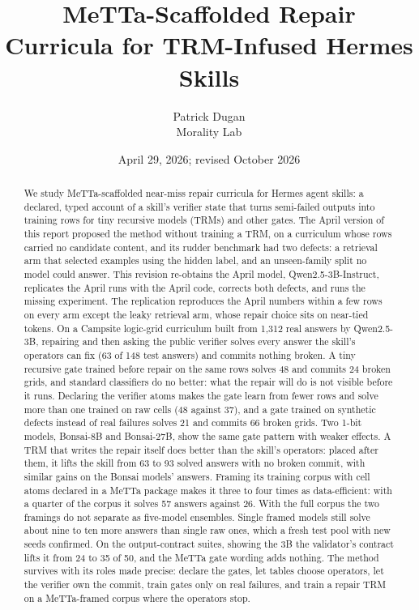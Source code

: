 \documentclass[11pt]{article}
\title{MeTTa-Scaffolded Repair Curricula for TRM-Infused Hermes Skills}
\author{Patrick Dugan\\Morality Lab}
\date{April 29, 2026; revised October 2026}
\begin{document}
\maketitle

\begin{abstract}
We study MeTTa-scaffolded near-miss repair curricula for Hermes agent skills: a declared, typed account of a skill's verifier state that turns semi-failed outputs into training rows for tiny recursive models (TRMs) and other gates. The April version of this report proposed the method without training a TRM, on a curriculum whose rows carried no candidate content, and its rudder benchmark had two defects: a retrieval arm that selected examples using the hidden label, and an unseen-family split no model could answer. This revision re-obtains the April model, Qwen2.5-3B-Instruct, replicates the April runs with the April code, corrects both defects, and runs the missing experiment. The replication reproduces the April numbers within a few rows on every arm except the leaky retrieval arm, whose repair choice sits on near-tied tokens. On a Campsite logic-grid curriculum built from 1{,}312 real answers by Qwen2.5-3B, repairing and then asking the public verifier solves every answer the skill's operators can fix (63 of 148 test answers) and commits nothing broken. A tiny recursive gate trained before repair on the same rows solves 48 and commits 24 broken grids, and standard classifiers do no better: what the repair will do is not visible before it runs. Declaring the verifier atoms makes the gate learn from fewer rows and solve more than one trained on raw cells (48 against 37), and a gate trained on synthetic defects instead of real failures solves 21 and commits 66 broken grids. Two 1-bit models, Bonsai-8B and Bonsai-27B, show the same gate pattern with weaker effects. A TRM that writes the repair itself does better than the skill's operators: placed after them, it lifts the skill from 63 to 93 solved answers with no broken commit, with similar gains on the Bonsai models' answers. Framing its training corpus with cell atoms declared in a MeTTa package makes it three to four times as data-efficient: with a quarter of the corpus it solves 57 answers against 26. With the full corpus the two framings do not separate as five-model ensembles. Single framed models still solve about nine to ten more answers than single raw ones, which a fresh test pool with new seeds confirmed. On the output-contract suites, showing the 3B the validator's contract lifts it from 24 to 35 of 50, and the MeTTa gate wording adds nothing. The method survives with its roles made precise: declare the gates, let tables choose operators, let the verifier own the commit, train gates only on real failures, and train a repair TRM on a MeTTa-framed corpus where the operators stop.
\end{abstract}
\end{document}
